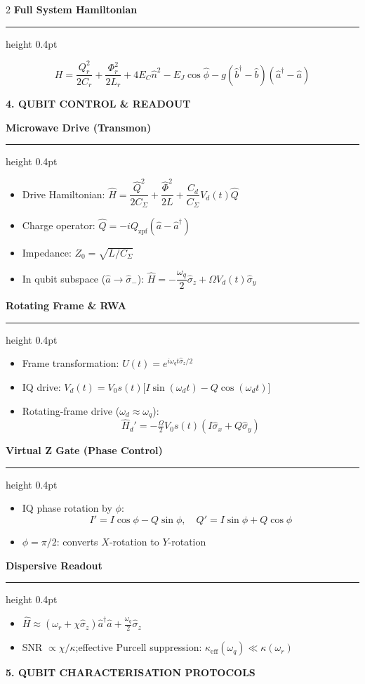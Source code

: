 \documentclass[10pt,a4paper]{article}
\newcommand{\sectionbox}[1]{%
  \vspace{3pt}%
  \noindent\colorbox{headerbg}{\parbox{\linewidth-2\fboxsep}%
    {\bfseries\small\color{white}\MakeUppercase{#1}}}%
  \vspace{1pt}%
}
\newcommand{\subsec}[1]{%
  \vspace{3pt}%
  {\small\bfseries\color{subseccolor}#1}%
  \vspace{1pt}\hrule height 0.4pt \vspace{2pt}%
}
\begin{document}
\begin{multicols}{2}
\subsec{Full System Hamiltonian}
\[
H=\frac{Q_r^2}{2C_r}+\frac{\Phi_r^2}{2L_r}+4E_C\hat n^2-E_J\cos\hat\phi
  -g(\hat b^\dagger-\hat b)(\hat a^\dagger-\hat a)
\]

\sectionbox{4. Qubit Control \& Readout}

\subsec{Microwave Drive (Transmon)}
\begin{itemize}
  \item Drive Hamiltonian: $\hat H=\dfrac{\hat Q^2}{2C_\Sigma}+\dfrac{\hat\Phi^2}{2L}+\dfrac{C_d}{C_\Sigma}V_d(t)\hat Q$
  \item Charge operator: $\hat Q=-iQ_\text{zpf}(\hat a-\hat a^\dagger)$
  \item Impedance: $Z_0=\sqrt{L/C_\Sigma}$
  \item In qubit subspace ($\hat a\to\hat\sigma_-$): $\hat H=-\dfrac{\omega_q}{2}\hat\sigma_z+\Omega V_d(t)\hat\sigma_y$
\end{itemize}

\subsec{Rotating Frame \& RWA}
\begin{itemize}
  \item Frame transformation: $U(t)=e^{i\omega_q t\hat\sigma_z/2}$
  \item IQ drive: $V_d(t)=V_0 s(t)\bigl[I\sin(\omega_d t)-Q\cos(\omega_d t)\bigr]$
  \item Rotating-frame drive ($\omega_d\approx\omega_q$):
  \[\hat H_d'=-\tfrac{\Omega}{2}V_0 s(t)(I\hat\sigma_x+Q\hat\sigma_y)\]
\end{itemize}

\subsec{Virtual Z Gate (Phase Control)}
\begin{itemize}
  \item IQ phase rotation by $\phi$:
  \[I'=I\cos\phi-Q\sin\phi,\quad Q'=I\sin\phi+Q\cos\phi\]
  \item $\phi=\pi/2$: converts $X$-rotation to $Y$-rotation
\end{itemize}

\subsec{Dispersive Readout}
\begin{itemize}
  \item $\hat H\approx(\omega_r+\chi\hat\sigma_z)\hat a^\dagger\hat a+\tfrac{\omega_q}{2}\hat\sigma_z$
  \item SNR $\propto \chi/\kappa$;\quad effective Purcell suppression: $\kappa_\text{eff}(\omega_q)\ll\kappa(\omega_r)$
\end{itemize}

\sectionbox{5. Qubit Characterisation Protocols}


\end{multicols}
\end{document}
